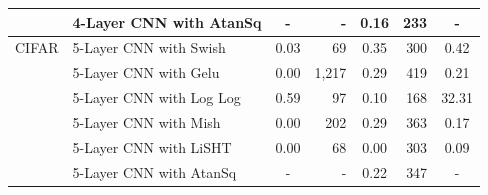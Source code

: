 \begin{table}[t]
{\begin{tabular}{|ll|cr|cr|c|}
			\multicolumn{1}{|l|}{}      & 4-Layer CNN with
			AtanSq\footnotemark{}                                 &
			\multicolumn{1}{c|}{-}            & -        &
			\multicolumn{1}{c|}{0.16}         & 233                           &
			-                                                 \\ \hline \hline
			\multicolumn{1}{|l|}{CIFAR} & 5-Layer CNN with
			Swish                                     &
			\multicolumn{1}{c|}{0.03}         & 69       &
			\multicolumn{1}{c|}{0.35}         & 300                           &
			0.42                                              \\ \cline{2-7}
			\multicolumn{1}{|l|}{}      & 5-Layer CNN with
			Gelu                                      &
			\multicolumn{1}{c|}{0.00}         & 1,217    &
			\multicolumn{1}{c|}{0.29}          & 419                           &
			0.21                                              \\ \cline{2-7}
			\multicolumn{1}{|l|}{}      & 5-Layer CNN with
			Log Log                                      &
			\multicolumn{1}{c|}{0.59}         & 97    &
			\multicolumn{1}{c|}{0.10}          & 168                           &
			32.31                                              \\ \cline{2-7}
			\multicolumn{1}{|l|}{}      & 5-Layer CNN with
			Mish                                      &
			\multicolumn{1}{c|}{0.00}         & 202      &
			\multicolumn{1}{c|}{0.29}         & 363                           &
			0.17                                              \\ \cline{2-7}
			\multicolumn{1}{|l|}{}      & 5-Layer CNN with
			LiSHT                                     &
			\multicolumn{1}{c|}{0.00}         & 68       &
			\multicolumn{1}{c|}{0.00}          & 303                           &
			0.09                                              \\ \cline{2-7}
			\multicolumn{1}{|l|}{}      & 5-Layer CNN with
			AtanSq\footnotemark[1]{}                                    &
			\multicolumn{1}{c|}{-}            & -        &
			\multicolumn{1}{c|}{0.22}          & 347                           &
			-                                                 \\ \hline
		\end{tabular}
	}

\end{table}



